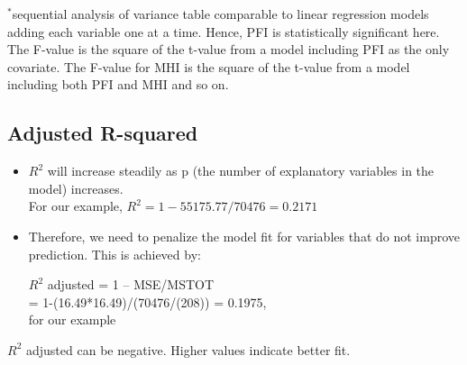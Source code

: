 \documentclass[
]{book}
\begin{document}
\(^*\)sequential analysis of variance table comparable to linear regression models adding each variable one at a time. Hence, PFI is statistically significant here. The F-value is the square of the t-value from a model including PFI as the only covariate. The F-value for MHI is the square of the t-value from a model including both PFI and MHI and so on.

\hypertarget{adjusted-r-squared}{%
\subsection{Adjusted R-squared}\label{adjusted-r-squared}}

\begin{itemize}
\item
  \(R^2\) will increase steadily as p (the number of explanatory variables in the model) increases.\\
  For our example, \(R^2 =1-55175.77/70476 = 0.2171\)
\item
  Therefore, we need to penalize the model fit for variables that do not improve prediction. This is achieved by:

  \(R^2\) adjusted = 1 -- MSE/MSTOT\\
  = 1-(16.49*16.49)/(70476/(208)) = 0.1975,\\
  for our example
\end{itemize}

\(R^2\) adjusted can be negative. Higher values indicate better fit.

  
\end{document}
